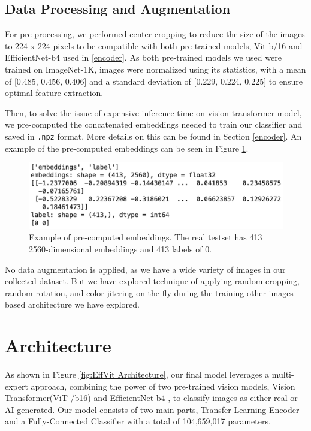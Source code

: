 \documentclass{article} %
\begin{document}
\subsection{Data Processing and Augmentation}
\label{data_processing}
For pre-processing, we performed center cropping to reduce the size of the images to 224 x 224 pixels to be compatible with both pre-trained models, Vit-b/16 \citep{dosovitskiy2020image} and EfficientNet-b4 \citep{tan2019efficientnet} used in \ref{encoder}. As both pre-trained models we used were trained on ImageNet-1K, images were normalized using its statistics, with a mean of [0.485, 0.456, 0.406] and a standard deviation of [0.229, 0.224, 0.225] to ensure optimal feature extraction.

Then, to solve the issue of expensive inference time on vision transformer model, we pre-computed the concatenated embeddings needed to train our classifier and saved in \texttt{.npz} format. More details on this can be found in Section \ref{encoder}. An example of the pre-computed embeddings can be seen in Figure \ref{fig:pre-computation}.

\begin{figure}[h]
    \begin{center}
        \includegraphics[scale=0.27]{figs/pre-computation.png}
    \end{center}
    \caption{Example of pre-computed embeddings. The real testset has 413 2560-dimensional embeddings and 413 labels of 0.} 
    \label{fig:pre-computation}
\end{figure}
No data augmentation is applied, as we have a wide variety of images in our collected dataset. But we have explored technique of applying random cropping, random rotation, and color jitering on the fly during the training other images-based architecture we have explored.

\section{Architecture}
\label{arch}

As shown in Figure \ref{fig:EffVit Architecture}, our final model leverages a multi-expert approach, combining the power of two pre-trained vision models, Vision Transformer(ViT-/b16) \citep{dosovitskiy2020image} and EfficientNet-b4 \citep{brock2019largescalegantraining}, to classify images as either real or AI-generated. Our model consists of two main parts, Transfer Learning Encoder and a Fully-Connected Classifier with a total of 104,659,017 parameters. 
\end{document}
